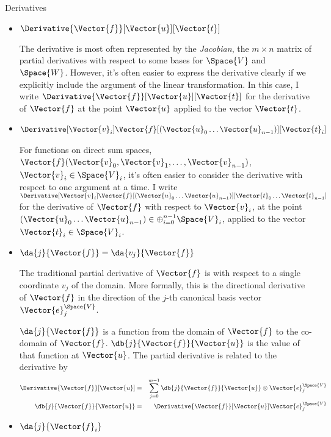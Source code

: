\begin{plSection}{Derivatives}
\begin{itemize}
\item $\Derivative{\Vector{f}}[\Vector{u}][\Vector{t}]$

The derivative is most often represented by the \textit{Jacobian},
the $m \times n$ matrix of partial derivatives
with respect to some bases for $\Space{V}$ and $\Space{W}$.
However, it's often easier to express the derivative clearly if we
explicitly include the argument of the linear transformation.
In this case, I write 
$\Derivative{\Vector{f}}[\Vector{u}][\Vector{t}]$
for the derivative of $\Vector{f}$ at the point $\Vector{u}$
applied to the vector $\Vector{t}$.

\item $\Derivative
[\Vector{v}_i]
{\Vector{f}}
[(\Vector{u}_0 \ldots \Vector{u}_{n-1})]
[\Vector{t}_i]$

For functions on direct sum spaces,
$\Vector{f}(\Vector{v}_0,\Vector{v}_1, \ldots, \Vector{v}_{n-1})$, 
$\Vector{v}_i \in \Space{V}_i$,
it's often easier to consider the derivative
with respect to one argument at a time.
I write 
$\Derivative[\Vector{v}_i]{\Vector{f}}
[(\Vector{u}_0 \ldots \Vector{u}_{n-1})]
[\Vector{t}_0 \ldots \Vector{t}_{n-1}]$
for the derivative of $\Vector{f}$ with respect to $\Vector{v}_i$,
at the point 
$(\Vector{u}_0 \ldots \Vector{u}_{n-1}) \in 
\oplus_{i=0}^{n-1} \Space{V}_i$,
applied to the vector $\Vector{t}_i \in \Space{V}_i$.

\item $\da{j}{\Vector{f}} = \da{v_j}{\Vector{f}}$

The traditional partial derivative of $\Vector{f}$ is with respect to
a single coordinate $v_j$ of the domain.
More formally, this is the directional derivative of $\Vector{f}$
in the direction of the $j$-th canonical basis vector 
$\Vector{e}_j^{\Space{V}}$.

$\da{j}{\Vector{f}}$ is a function from the domain 
of $\Vector{f}$ to the co-domain of $\Vector{f}$.
$\db{j}{\Vector{f}}{\Vector{u}}$ is the value of that function 
at $\Vector{u}$.
The partial derivative is related to the derivative by
\begin{eqnarray}
\label{eq:partial-full-dervatives}
\Derivative{\Vector{f}}[\Vector{u}]
& = &
\sum_{j=0}^{m-1} \db{j}{\Vector{f}}{\Vector{u}} 
\otimes \Vector{e}_j^{\Space{V}}
\\
\db{j}{\Vector{f}}{\Vector{u}}
& = &
\Derivative{\Vector{f}}[\Vector{u}] \Vector{e}_j^{\Space{V}}
\nonumber
\end{eqnarray}

\item $\da{j}{\Vector{f}_i}$


\end{itemize}
\end{plSection}
